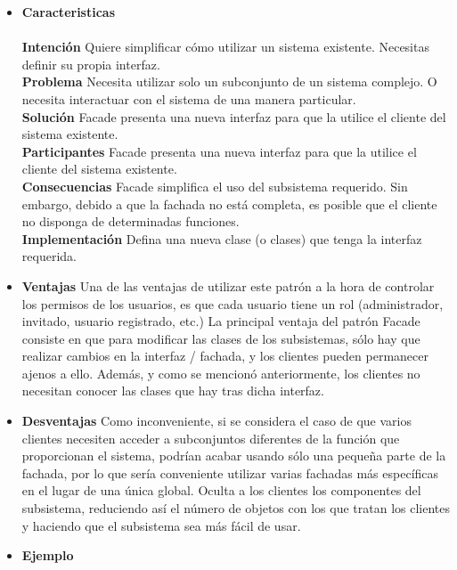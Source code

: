 \documentclass[twoside,twocolumn]{article}
\begin{document}
\begin{itemize}

\item  \textbf{Caracteristicas}
\\
\\ \textbf{Intención}
Quiere simplificar cómo utilizar un sistema existente. Necesitas definir
su propia interfaz.
\\ \textbf{Problema}
Necesita utilizar solo un subconjunto de un sistema complejo. O necesita interactuar con el sistema de una manera particular.
\\ \textbf{Solución}
Facade presenta una nueva interfaz para que la utilice el cliente del sistema existente.
\\ \textbf{Participantes}
Facade presenta una nueva interfaz para que la utilice el cliente del sistema existente.
\\ \textbf{Consecuencias}
Facade simplifica el uso del subsistema requerido. Sin embargo, debido a que la fachada no está completa, es posible que el cliente no disponga de determinadas funciones.
\\ \textbf{Implementación}
Defina una nueva clase (o clases) que tenga la interfaz requerida.
\\
\item  \textbf{Ventajas}
Una de las ventajas de utilizar este patrón a la hora de controlar los permisos de los usuarios, es que cada usuario tiene un rol (administrador, invitado, usuario registrado, etc.)
La principal ventaja del patrón Facade consiste en que para modificar las clases de los subsistemas, sólo hay que realizar cambios en la interfaz / fachada, y los clientes pueden permanecer ajenos a ello. Además, y como se mencionó anteriormente, los clientes no necesitan conocer las clases que hay tras dicha interfaz.

\item  \textbf{Desventajas}
Como inconveniente, si se considera el caso de que varios clientes necesiten acceder a subconjuntos diferentes de la función que proporcionan el sistema, podrían acabar usando sólo una pequeña parte de la fachada, por lo que sería conveniente utilizar varias fachadas más específicas en el lugar de una única global.
Oculta a los clientes los componentes del subsistema, reduciendo así el número de objetos con los que tratan los clientes y haciendo que el subsistema sea más fácil de usar.
\item  \textbf{Ejemplo}


\end{itemize}
\end{document}
